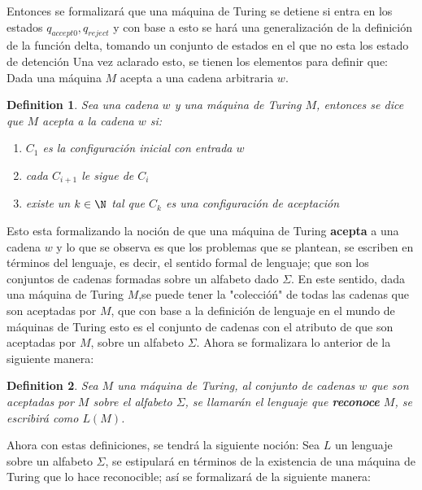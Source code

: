 \documentclass[10pt]{report}
\newtheorem{definition}{Definition}
\begin{document}
    Entonces se formalizará que una máquina de Turing se detiene si entra en los estados
    $q_{accept0},q_{reject}$ y con base a esto se hará una generalización de la definición de la función delta, tomando
    un conjunto de estados en el que no esta los estado de detención
    \newline
    Una vez aclarado esto, se tienen los elementos para definir que:\newline
    Dada una máquina $M$ acepta a una
    cadena arbitraria $w$.  
    \begin{definition}
        Sea una cadena $w$ y una máquina de Turing $M$,\newline
        entonces se dice que $M$ acepta a la cadena $w$ si:
        \begin{enumerate}
            \item $C_{1}$ es la configuración inicial con entrada $w$
            \item cada $C_{i+1}$ le sigue de $C_{i}$
            \item existe un $k \in \N$ tal que $C_{k}$ es una configuración de aceptación
        \end{enumerate}
    \end{definition}
    Esto esta formalizando la noción de que una máquina de Turing \textbf{acepta} a una cadena $w$
    y lo que se observa es que los problemas que se plantean, se
    escriben en términos del lenguaje, es decir, el sentido formal de lenguaje; que son los
    conjuntos de cadenas formadas sobre un alfabeto dado $\Sigma$.
    \newpage
    En este sentido, dada una máquina de Turing $M$,se puede tener la "coleccióń" de todas
    las cadenas que son aceptadas por $M$, que con base a la definición de lenguaje en el mundo de máquinas de Turing
    esto es el conjunto de cadenas con el atributo de que son aceptadas por $M$, sobre un alfabeto $\Sigma$.
    \newline
    Ahora se formalizara lo anterior de la siguiente manera:
    \begin{definition}
        Sea $M$ una máquina de Turing, al conjunto de cadenas $w$ que son aceptadas por $M$ sobre el alfabeto $\Sigma$,
        se llamarán el lenguaje que \textbf{reconoce} $M$, se escribirá como $L(M)$.

    \end{definition}
    \space
    Ahora con estas definiciones, se tendrá la siguiente noción: \newline Sea $L$ un lenguaje sobre un alfabeto $\Sigma$,
    se estipulará en términos de la existencia de una máquina de Turing que lo hace reconocible;
    así se formalizará de la siguiente manera: \newline
\end{document}
